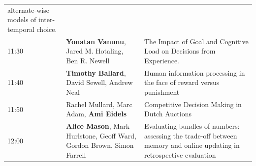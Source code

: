 \documentclass[]{article}
\begin{document}
\begin{longtable}[]{@{}lll@{}}
\begin{minipage}[t]{0.51\columnwidth}
alternate-wise models of inter-temporal choice.\strut
\end{minipage}\tabularnewline
\begin{minipage}[t]{0.03\columnwidth}\raggedright\strut
11:30\strut
\end{minipage} & \begin{minipage}[t]{0.38\columnwidth}\raggedright\strut
\textbf{Yonatan Vanunu}, Jared M. Hotaling, Ben R. Newell\strut
\end{minipage} & \begin{minipage}[t]{0.51\columnwidth}\raggedright\strut
The Impact of Goal and Cognitive Load on Decisions from
Experience.\strut
\end{minipage}\tabularnewline
\begin{minipage}[t]{0.03\columnwidth}\raggedright\strut
11:40\strut
\end{minipage} & \begin{minipage}[t]{0.38\columnwidth}\raggedright\strut
\textbf{Timothy Ballard}, David Sewell, Andrew Neal\strut
\end{minipage} & \begin{minipage}[t]{0.51\columnwidth}\raggedright\strut
Human information processing in the face of reward versus
punishment\strut
\end{minipage}\tabularnewline
\begin{minipage}[t]{0.03\columnwidth}\raggedright\strut
11:50\strut
\end{minipage} & \begin{minipage}[t]{0.38\columnwidth}\raggedright\strut
Rachel Mullard, Marc Adam, \textbf{Ami Eidels}\strut
\end{minipage} & \begin{minipage}[t]{0.51\columnwidth}\raggedright\strut
Competitive Decision Making in Dutch Auctions\strut
\end{minipage}\tabularnewline
\begin{minipage}[t]{0.03\columnwidth}\raggedright\strut
12:00\strut
\end{minipage} & \begin{minipage}[t]{0.38\columnwidth}\raggedright\strut
\textbf{Alice Mason}, Mark Hurlstone, Geoff Ward, Gordon Brown, Simon
Farrell\strut
\end{minipage} & \begin{minipage}[t]{0.51\columnwidth}\raggedright\strut
Evaluating bundles of numbers: assessing the trade-off between memory
and online updating in retrospective evaluation\strut
\end{minipage}\tabularnewline

\end{longtable}
\end{document}
